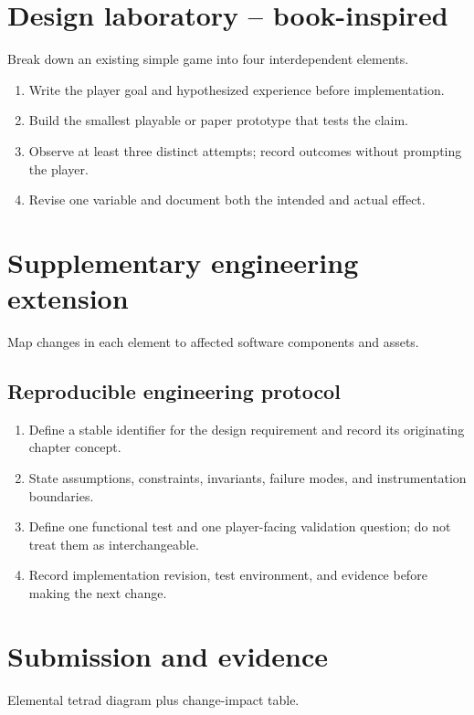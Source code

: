 \documentclass[11pt]{article}
\begin{document}
\section{Design laboratory -- book-inspired}
Break down an existing simple game into four interdependent elements.

\begin{enumerate}
\item Write the player goal and hypothesized experience before implementation.
\item Build the smallest playable or paper prototype that tests the claim.
\item Observe at least three distinct attempts; record outcomes without prompting the player.
\item Revise one variable and document both the intended and actual effect.
\end{enumerate}

\section{Supplementary engineering extension}
Map changes in each element to affected software components and assets.


\subsection{Reproducible engineering protocol}
\begin{enumerate}
\item Define a stable identifier for the design requirement and record its originating chapter concept.
\item State assumptions, constraints, invariants, failure modes, and instrumentation boundaries.
\item Define one functional test and one player-facing validation question; do not treat them as interchangeable.
\item Record implementation revision, test environment, and evidence before making the next change.
\end{enumerate}

\section{Submission and evidence}
Elemental tetrad diagram plus change-impact table.
\end{document}
